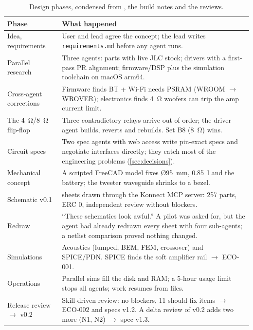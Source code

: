 \begin{table}[htbp]
\centering\small
\caption{Design phases, condensed from \protect{}, the build notes and the reviews.}
\label{tab:timeline}
\begin{tabularx}{\linewidth}{@{}>{\raggedright\arraybackslash}p{2.9cm}>{\raggedright\arraybackslash}X@{}}
\toprule
Phase & What happened \\
\midrule
Idea, requirements & User and lead agree the concept; the lead writes \texttt{requirements.md} before any agent runs. \\
Parallel research & Three agents: parts with live JLC stock; drivers with a first-pass PR alignment; firmware/DSP plus the simulation toolchain on macOS arm64. \\
Cross-agent corrections & Firmware finds BT + Wi-Fi needs PSRAM (WROOM $\to$ WROVER); electronics finds \qty{4}{\ohm} woofers can trip the amp current limit. \\
The \qty{4}{\ohm}/\qty{8}{\ohm} flip-flop & Three contradictory relays arrive out of order; the driver agent builds, reverts and rebuilds. Set B8 (\qty{8}{\ohm}) wins. \\
Circuit specs & Two spec agents with web access write pin-exact specs and negotiate interfaces directly; they catch most of the engineering problems (\cref{sec:decisions}). \\
Mechanical concept & A scripted FreeCAD model fixes Ø\qty{95}{\milli\metre}, \qty{0.85}{\litre} and the battery; the tweeter waveguide shrinks to a bezel. \\
Schematic v0.1 & 9 sheets drawn through the Konnect MCP server: 257 parts, ERC 0, independent review without blockers. \\
Redraw & ``These schematics look awful.'' A pilot was asked for, but the agent had already redrawn every sheet with four sub-agents; a netlist comparison proved nothing changed. \\
Simulations & Acoustics (lumped, BEM, FEM, crossover) and SPICE/PDN. SPICE finds the soft amplifier rail $\to$ ECO-001. \\
Operations & Parallel sims fill the disk and RAM; a 5-hour usage limit stops all agents; work resumes from files. \\
Release review $\to$ v0.2 & Skill-driven review: no blockers, 11 should-fix items $\to$ ECO-002 and specs v1.2. A delta review of v0.2 adds two more (N1, N2) $\to$ spec v1.3. \\
\bottomrule
\end{tabularx}
\end{table}

